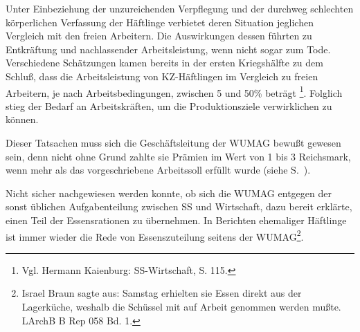 \documentclass[a4paper,12pt,ngerman,
]{nisebook}
\begin{document}
Unter Einbeziehung der unzureichenden Verpflegung und der durchweg schlechten körperlichen Verfassung der Häftlinge verbietet deren Situation jeglichen Vergleich mit den freien Arbeitern. Die Auswirkungen dessen führten zu Entkräftung und nachlassender Arbeitsleistung, wenn nicht sogar zum Tode. Verschiedene Schätzungen kamen bereits in der ersten Kriegshälfte zu dem Schluß, dass die Arbeitsleistung von KZ-Häftlingen im Vergleich zu freien Arbeitern, je nach Arbeitsbedingungen, zwischen 5 und 50\% beträgt \footnote{Vgl. Hermann Kaienburg: SS-Wirtschaft, S. 115.}. Folglich stieg der Bedarf an Arbeitskräften, um die Produktionsziele verwirklichen zu können.

Dieser Tatsachen muss sich die Geschäftsleitung der WUMAG bewußt gewesen sein, denn nicht ohne Grund zahlte sie Prämien\label{pramie} im Wert von 1 bis 3 Reichsmark, wenn mehr als das vorgeschriebene Arbeitssoll erfüllt wurde (siehe S.~\pageref{pramien}).

Nicht sicher nachgewiesen werden konnte, ob sich die WUMAG entgegen der sonst üblichen Aufgabenteilung zwischen SS und Wirtschaft, dazu bereit erklärte, einen Teil der Essensrationen zu übernehmen. In Berichten ehemaliger Häftlinge ist immer wieder die Rede von Essenszuteilung seitens der WUMAG\footnote{Israel Braun sagte aus: \glqq Samstag erhielten sie Essen direkt aus der Lagerküche, weshalb die Schüssel mit auf Arbeit genommen werden mußte\grqq. LArchB B Rep 058 Bd. 1.}.

\label{muller}
\end{document}
